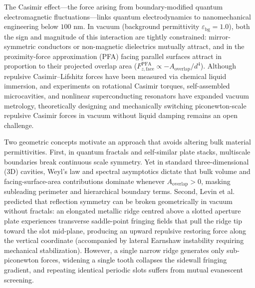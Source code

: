 \documentclass[11pt, a4paper]{article}
\begin{document}
The Casimir effect---the force arising from boundary-modified quantum electromagnetic fluctuations\cite{casimir1948,bordag2009}---links quantum electrodynamics to nanomechanical engineering below $100\text{ nm}$. In vacuum (background permittivity $\varepsilon_{\mathrm{bg}}=1.0$), both the sign and magnitude of this interaction are tightly constrained: mirror-symmetric conductors or non-magnetic dielectrics mutually attract\cite{kennethklich2006}, and in the proximity-force approximation (PFA) facing parallel surfaces attract in proportion to their projected overlap area ($F_{z,\mathrm{face}}^{\mathrm{PFA}} \propto -A_{\mathrm{overlap}}/d^4$). Although repulsive Casimir--Lifshitz forces have been measured via chemical liquid immersion\cite{munday2009}, and experiments on rotational Casimir torques\cite{somers2018}, self-assembled microcavities\cite{munkhbat2021}, and nonlinear superconducting resonators\cite{dejong2026} have expanded vacuum metrology, theoretically designing and mechanically switching piconewton-scale repulsive Casimir forces in vacuum without liquid damping remains an open challenge\cite{rodriguez2011}.

Two geometric concepts motivate an approach that avoids altering bulk material permittivities. First, in quantum fractals\cite{kempkes2019,xu2021} and self-similar plate stacks\cite{akkermans2010,shajesh2016,shajesh2017}, multiscale boundaries break continuous scale symmetry\cite{milton2004,milton2016,gordon2026prd}. Yet in standard three-dimensional (3D) cavities, Weyl's law and spectral asymptotics\cite{lapidus1991} dictate that bulk volume and facing-surface-area contributions dominate whenever $A_{\mathrm{overlap}} > 0$, masking subleading perimeter and hierarchical boundary terms. Second, Levin et al.\cite{levin2010} predicted that reflection symmetry can be broken geometrically in vacuum without fractals: an elongated metallic ridge centred above a slotted aperture plate experiences transverse saddle-point fringing fields that pull the ridge tip toward the slot mid-plane, producing an upward repulsive restoring force along the vertical coordinate (accompanied by lateral Earnshaw instability requiring mechanical stabilization)\cite{levin2010,rodriguez2011}. However, a single narrow ridge generates only sub-piconewton forces, widening a single tooth collapses the sidewall fringing gradient, and repeating identical periodic slots suffers from mutual evanescent screening.
\end{document}
